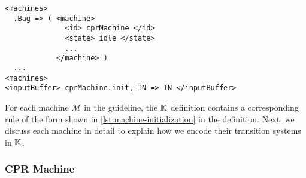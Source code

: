 \begin{lstlisting}[float=ht,
  frame=single,
  style=ksty,
  language=k,
  ]
<machines>
  .Bag => ( <machine>
              <id> cprMachine </id>
              <state> idle </state>
              ...
            </machine> )
  ...
<machines>
<inputBuffer> cprMachine.init, IN => IN </inputBuffer>
\end{lstlisting}

For each machine $\mathcal{M}$ in the guideline, the $\mathbb{K}$ definition
contains a corresponding rule of the form shown in
\autoref{lst:machine-initialization} in the definition. Next,
we discuss each machine in detail to explain how we encode
their transition systems in $\mathbb{K}$.

\subsubsection{CPR Machine}

